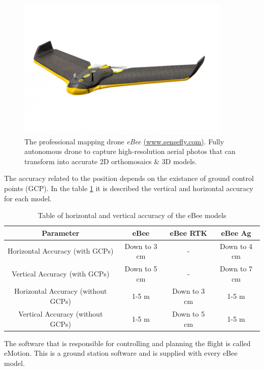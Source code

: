 \begin{figure}[H]
  \centering
  \includegraphics[width=4in]{figures/eBee.png}
  \caption[The professional mapping drone eBee]
   {The professional mapping drone \textit{eBee} \href{https://www.sensefly.com/drones/ebee.html}{(www.sensefly.com)}. Fully autonomous drone to capture high-resolution aerial photos that can transform into accurate 2D orthomosaics \& 3D models.}
   \label{fig:ebee}
\end{figure}

The accuracy related to the position depends on the existance of ground control points (GCP). In the table \ref{accuracy} it is described the vertical and horizontal accuracy for each model.

\begin{table}[h!]
	\centering
	\begin{tabular}{|c||c|c|c|}
		\hline
		Parameter & eBee & eBee RTK & eBee Ag\\ \hline\hline
		Horizontal Accuracy (with GCPs) & Down to 3 cm & - & Down to 4 cm\\ \hline
		Vertical Accuracy (with GCPs) & Down to 5 cm & - & Down to 7 cm\\ \hline
		Horizontal Accuracy (without GCPs) & 1-5 m & Down to 3 cm & 1-5 m\\ \hline
		Vertical Accuracy (without GCPs) & 1-5 m & Down to 5 cm & 1-5 m\\ \hline
	\end{tabular}
	\caption{Table of horizontal and vertical accuracy of the eBee models}
	\label{accuracy}
\end{table}

The software that is responsible for controlling and planning the flight is called eMotion. This is a ground station software and is supplied with every eBee model.